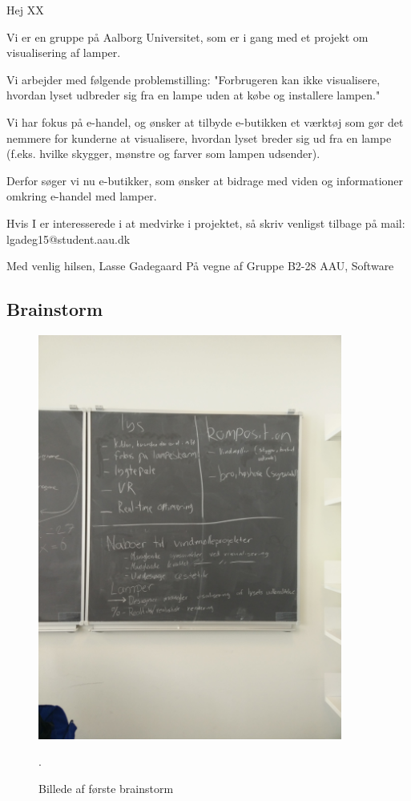 \documentclass[oneside,a4paper,titlepage]{article}
\begin{document}
Hej XX
 
Vi er en gruppe på Aalborg Universitet, som er i gang med et projekt om visualisering af lamper.
 
Vi arbejder med følgende problemstilling:
"Forbrugeren kan ikke visualisere, hvordan lyset udbreder sig fra en lampe uden at købe og installere lampen." 

Vi har fokus på e-handel, og ønsker at tilbyde e-butikken et værktøj som gør det nemmere for kunderne at visualisere, hvordan lyset breder sig ud fra en lampe (f.eks. hvilke skygger, mønstre og farver som lampen udsender). 

Derfor søger vi nu e-butikker, som ønsker at bidrage med viden og informationer omkring e-handel med lamper.  

Hvis I er interesserede i at medvirke i projektet, så skriv venligst tilbage på mail: lgadeg15@student.aau.dk 

Med venlig hilsen,\newline
Lasse Gadegaard\newline
På vegne af\newline
Gruppe B2-28\newline
AAU, Software

\subsection{Brainstorm}
\begin{figure}[H]
   \centering
   \includegraphics[width=10cm]{graphics/brainstorm_1}
   \caption{Billede af første brainstorm}.
\end{figure}
\end{document}

